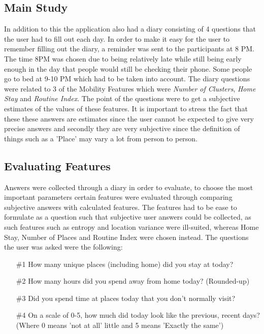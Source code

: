 \subsection{Main Study}
In addition to this the application also had a diary consisting of 4 questions that the user had to fill out each day. In order to make it easy for the user to remember filling out the diary, a reminder was sent to the participants at 8 PM. The time 8PM was chosen due to being relatively late while still being early enough in the day that people would still be checking their phone. Some people go to bed at 9-10 PM which had to be taken into account. The diary questions were related to 3 of the Mobility Features which were \textit{Number of Clusters}, \textit{Home Stay} and \textit{Routine Index}. The point of the questions were to get a subjective estimates of the values of these features. It is important to stress the fact that these these answers are estimates since the user cannot be expected to give very precise answers and secondly they are very subjective since the definition of things such as a 'Place' may vary a lot from person to person.

\subsection{Evaluating Features}
Answers were collected through a diary in order to evaluate, to choose the most important parameters certain features were evaluated through comparing subjective answers with calculated features. The features had to be ease to formulate as a question such that subjective user answers could be collected, as such features such as entropy and location variance were ill-suited, whereas Home Stay, Number of Places and Routine Index were chosen instead. The questions the user was asked were the following:

\begin{itemize}
    \item[\#1] How many unique places (including home) did you stay at today?
    \item[\#2] How many hours did you spend away from home today? (Rounded-up)
    \item[\#3] Did you spend time at places today that you don't normally visit?
    \item[\#4] On a scale of 0-5, how much did today look like the previous, recent days? (Where 0 means 'not at all' little and 5 means 'Exactly the same')
\end{itemize}

